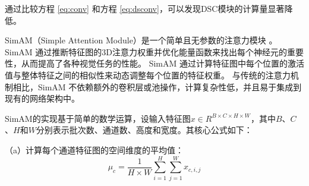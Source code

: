 通过比较方程 \ref{eq:conv} 和方程 \ref{eq:dsconv}，可以发现DSC模块的计算量显著降低。

\begin{figure}[htbp]
    \centering
    \captionsetup{font=footnotesize}
    \label{fig:nnConv}
\end{figure}

\begin{figure}[htbp]
    \centering
    \captionsetup{font=footnotesize}
    \label{fig:DSC}
\end{figure}

SimAM（Simple Attention Module）是一个简单且无参数的注意力模块 \cite{simam}。 
SimAM 通过推断特征图的3D注意力权重并优化能量函数来找出每个神经元的重要性，从而提高了各种视觉任务的性能。
SimAM 通过计算特征图中每个位置的激活值与整体特征之间的相似性来动态调整每个位置的特征权重。
与传统的注意力机制相比，SimAM 不依赖额外的卷积层或池操作，计算复杂性低，并且易于集成到现有的网络架构中。

SimAM的实现基于简单的数学运算，设输入特征图$x\in{R^{{B}\times{C}\times{H}\times{W}}}$，其中$B$、$C$、$H$和$W$分别表示批次数、通道数、高度和宽度。其核心公式如下：

（a）计算每个通道特征图的空间维度的平均值：
\begin{equation}
    \label{eq:simam1}
    \mu_c = \frac{1}{{H}\times{W}}\sum\limits_{i=1}^{H}\sum\limits_{j=1}^{W}x_{c,i,j}
\end{equation}

